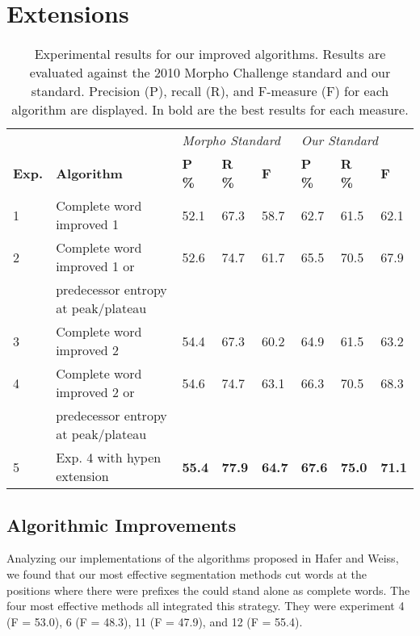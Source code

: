 \documentclass[11pt,letterpaper]{article}
\begin{document}
\section{Extensions}

\begin{table*}[t]
\centering
\begin{tabular}{|l|l|l|l|l|l|l|l|}
\hline
 &  & \multicolumn{3}{l|}{\textit{Morpho Standard}} & \multicolumn{3}{l|}{\textit{Our Standard}} \\ \cline{3-8} 
\textbf{Exp.} & \textbf{Algorithm} & \textbf{P \%} & \textbf{R \%} & \textbf{F} & \textbf{P \%} & \textbf{R \%} & \textbf{F} \\ \hline
1 & Complete word improved 1 & 52.1 & 67.3 & 58.7 & 62.7 & 61.5 & 62.1 \\
2 & Complete word improved 1 or & 52.6 & 74.7 & 61.7 & 65.5 & 70.5 & 67.9 \\
 & predecessor entropy at peak/plateau &  &  &  &  &  &  \\
3 & Complete word improved 2 & 54.4 & 67.3 & 60.2 & 64.9 & 61.5 & 63.2 \\
4 & Complete word improved 2 or & 54.6 & 74.7 & 63.1 & 66.3 & 70.5 & 68.3 \\
 & predecessor entropy at peak/plateau &  &  &  &  &  &  \\
5 & Exp. 4 with hypen extension & \textbf{55.4} & \textbf{77.9} & \textbf{64.7} & \textbf{67.6} & \textbf{75.0} & \textbf{71.1} \\ \hline
\end{tabular}
\caption{\label{tab:widgets}Experimental results for our improved algorithms. Results are evaluated against the 2010 Morpho Challenge standard and our standard. Precision (P), recall (R), and F-measure (F) for each algorithm are displayed. In bold are the best results for each measure.}
\end{table*}

\subsection{Algorithmic Improvements}

Analyzing our implementations of the algorithms proposed in Hafer and Weiss, we found that our most effective segmentation methods cut words at the positions where there were prefixes the could stand alone as complete words. The four most effective methods all integrated this strategy. They were experiment 4 (F = 53.0), 6 (F = 48.3), 11 (F = 47.9), and 12 (F = 55.4).
\end{document}
